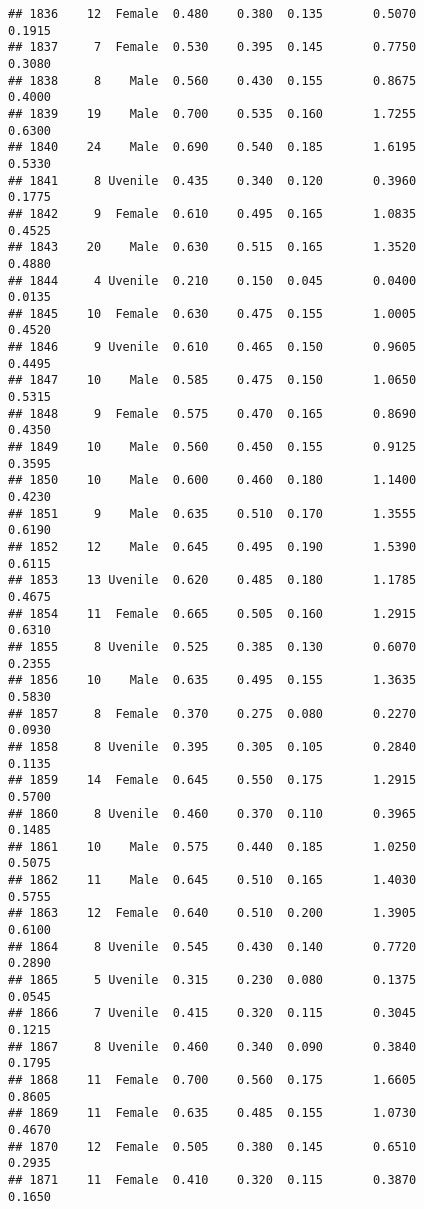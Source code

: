 \documentclass[
]{article}
\begin{document}
\begin{verbatim}
## 1836    12  Female  0.480    0.380  0.135       0.5070         0.1915
## 1837     7  Female  0.530    0.395  0.145       0.7750         0.3080
## 1838     8    Male  0.560    0.430  0.155       0.8675         0.4000
## 1839    19    Male  0.700    0.535  0.160       1.7255         0.6300
## 1840    24    Male  0.690    0.540  0.185       1.6195         0.5330
## 1841     8 Uvenile  0.435    0.340  0.120       0.3960         0.1775
## 1842     9  Female  0.610    0.495  0.165       1.0835         0.4525
## 1843    20    Male  0.630    0.515  0.165       1.3520         0.4880
## 1844     4 Uvenile  0.210    0.150  0.045       0.0400         0.0135
## 1845    10  Female  0.630    0.475  0.155       1.0005         0.4520
## 1846     9 Uvenile  0.610    0.465  0.150       0.9605         0.4495
## 1847    10    Male  0.585    0.475  0.150       1.0650         0.5315
## 1848     9  Female  0.575    0.470  0.165       0.8690         0.4350
## 1849    10    Male  0.560    0.450  0.155       0.9125         0.3595
## 1850    10    Male  0.600    0.460  0.180       1.1400         0.4230
## 1851     9    Male  0.635    0.510  0.170       1.3555         0.6190
## 1852    12    Male  0.645    0.495  0.190       1.5390         0.6115
## 1853    13 Uvenile  0.620    0.485  0.180       1.1785         0.4675
## 1854    11  Female  0.665    0.505  0.160       1.2915         0.6310
## 1855     8 Uvenile  0.525    0.385  0.130       0.6070         0.2355
## 1856    10    Male  0.635    0.495  0.155       1.3635         0.5830
## 1857     8  Female  0.370    0.275  0.080       0.2270         0.0930
## 1858     8 Uvenile  0.395    0.305  0.105       0.2840         0.1135
## 1859    14  Female  0.645    0.550  0.175       1.2915         0.5700
## 1860     8 Uvenile  0.460    0.370  0.110       0.3965         0.1485
## 1861    10    Male  0.575    0.440  0.185       1.0250         0.5075
## 1862    11    Male  0.645    0.510  0.165       1.4030         0.5755
## 1863    12  Female  0.640    0.510  0.200       1.3905         0.6100
## 1864     8 Uvenile  0.545    0.430  0.140       0.7720         0.2890
## 1865     5 Uvenile  0.315    0.230  0.080       0.1375         0.0545
## 1866     7 Uvenile  0.415    0.320  0.115       0.3045         0.1215
## 1867     8 Uvenile  0.460    0.340  0.090       0.3840         0.1795
## 1868    11  Female  0.700    0.560  0.175       1.6605         0.8605
## 1869    11  Female  0.635    0.485  0.155       1.0730         0.4670
## 1870    12  Female  0.505    0.380  0.145       0.6510         0.2935
## 1871    11  Female  0.410    0.320  0.115       0.3870         0.1650

\end{verbatim}
\end{document}
